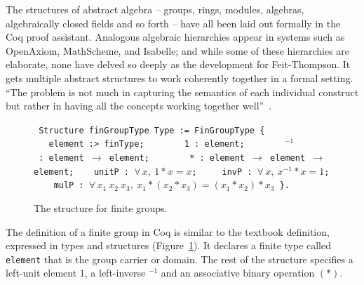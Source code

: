 \documentclass{llncs}
\begin{document}
The structures of abstract algebra -- groups, rings, modules,
algebras, algebraically closed fields and so forth -- have all been
laid out formally in the Coq proof assistant.  Analogous algebraic
hierarchies appear in systems such as OpenAxiom, MathScheme, and
Isabelle; and while some of these hierarchies are elaborate, none have
delved so deeply as the development for Feit-Thompson.
It gets multiple abstract structures to work coherently
together in a formal setting. ``The problem is not much in capturing
the semantics of each individual construct but rather in having all
the concepts working together well''~\cite{gonMF}. %
%
%


\begin{figure}
{

\obeylines\tt
Structure~finGroupType~Type~:= FinGroupType \{
~~~element~:>~finType;
~~~~~~~1~:~element;
~~~~~~\hskip0.8mm ${}^{-1}$~:~element $\to$ element;
~~~~~~~*~:~element $\to$ element $\to$ element;
~~~unitP~:~$\forall\,x,~1*x = x$;
~~~~invP~:~$\forall\,x,~x^{-1} * x = 1$;
~~~~mulP~:~$\forall\,x_1~x_2~x_3,~ x_1 * (x_2 * x_3) = (x_1 * x_2) * x_3$
\}.

}
\caption{The structure for finite groups.}
\label{fig:group}
\end{figure}

The definition of a finite group in Coq is similar to the textbook definition,
expressed in types and structures (Figure~\ref{fig:group}).
It declares a finite type called {\tt element} that is the group
carrier or domain.  The rest of the structure specifies a left-unit
element $1$, a left-inverse ${}^{-1}$ and an associative binary
operation $( * )$.  
\end{document}
